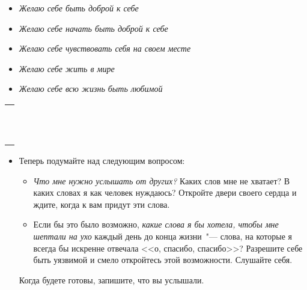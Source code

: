 \begin{itemize}
	\begin{itemize}
		\item \emph{Желаю себе быть доброй к себе}
		\item \emph{Желаю себе начать быть доброй к себе}
		\item \emph{Желаю себе чувствовать себя на своем месте}
		\item \emph{Желаю себе жить в мире}
		\item \emph{Желаю себе всю жизнь быть любимой} 
	\end{itemize}
	
	\setlength{\extrarowheight}{2mm}
	\begin{tabularx}{0.96\textwidth}{X}
		\\
		\arrayrulecolor{gray}\hline\\
		\hline\\
		\hline\\
		\hline\\
		\hline\\
		\hline\\
		\hline\\
		\hline\\
		\hline\\
		\hline\\
		\hline\\
		\hline\\
	\end{tabularx}
	\setlength{\extrarowheight}{0mm}
\end{itemize}

\vspace{4ex}

\begin{itemize}
	\item Теперь подумайте над следующим вопросом:
	
	\begin{itemize}
		\item \emph{Что мне нужно услышать от других?} Каких слов мне не хватает? В каких словах я как человек нуждаюсь? Откройте двери своего сердца и ждите, когда к вам придут эти слова.
		
		\item Если бы это было возможно, \emph{какие слова я бы хотела, чтобы мне шептали на ухо} каждый день до конца жизни~"--- слова, на которые я всегда бы искренне отвечала <<о, спасибо, спасибо>>? Разрешите себе быть уязвимой и смело откройтесь этой возможности. Слушайте себя.
	\end{itemize}
	
	\newpage
	\itemWritingHand Когда будете готовы, запишите, что вы услышали.
\end{itemize}

